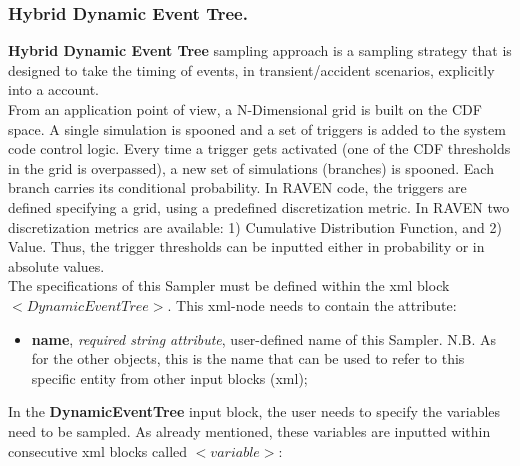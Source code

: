 \subsubsection{Hybrid Dynamic Event Tree.}
\label{subsubsubsec:HDET}
\textbf{Hybrid Dynamic Event Tree} sampling approach is a sampling strategy that is designed to take the timing of events, in transient/accident scenarios, explicitly into a account.
\\ From an application point of view, a N-Dimensional grid is built on the CDF space. A single simulation is spooned and a set of triggers is added to the system code control logic. Every time a trigger gets activated (one of the CDF thresholds in the grid is overpassed), a new set of simulations (branches) is spooned. Each branch carries its conditional probability. In RAVEN code, the triggers are defined specifying a grid, using a predefined discretization metric.
In RAVEN two discretization metrics are available: 1) Cumulative Distribution Function, and 2) Value. Thus, the trigger thresholds can be inputted either in probability or in absolute values.
\\ The specifications of this Sampler must be defined within the xml block $<DynamicEventTree>$. This xml-node needs to contain the attribute:
\begin{itemize}
\itemsep0em
\item \textbf{name}, \textit{required string attribute}, user-defined name of this Sampler. N.B. As for the other objects, this is the name that can be used to refer to this specific entity from other input blocks (xml);
\end{itemize}
In the \textbf{DynamicEventTree} input block, the user needs to specify the variables need to be sampled. As already mentioned, these variables are inputted within consecutive xml blocks called $<variable>$:
